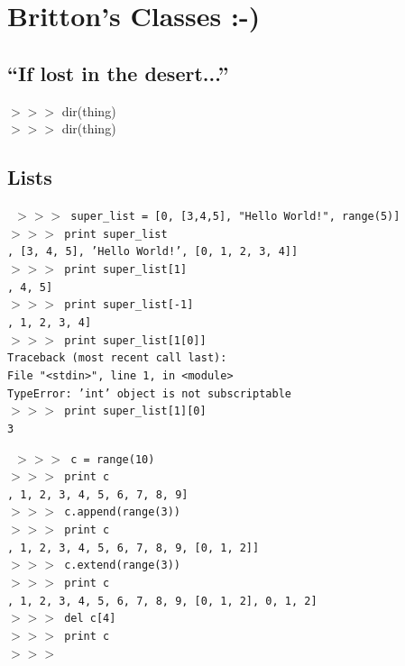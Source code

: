\documentclass[11pt,a4paper]{article}
\begin{document}
\section{Britton's Classes :-)}

\subsection{``If lost in the desert...''}
$>>>$ dir(thing) \\
$>>>$ dir(thing) \\


\subsection{Lists}
{\tt 
$>>>$ super\_list = [0, [3,4,5], "Hello World!", range(5)] \\
$>>>$ print super\_list \\
, [3, 4, 5], 'Hello World!', [0, 1, 2, 3, 4]] \\
$>>>$ print super\_list[1] \\
, 4, 5] \\
$>>>$ print super\_list[-1]\\
, 1, 2, 3, 4] \\
$>>>$ print super\_list[1[0]] \\
Traceback (most recent call last):\\
  File "<stdin>", line 1, in <module>\\
TypeError: 'int' object is not subscriptable\\
$>>>$ print super\_list[1][0] \\
  3\\
}

{\tt 
$>>>$ c = range(10) \\
$>>>$ print c \\
, 1, 2, 3, 4, 5, 6, 7, 8, 9]\\
$>>>$ c.append(range(3)) \\
$>>>$ print c \\
, 1, 2, 3, 4, 5, 6, 7, 8, 9, [0, 1, 2]]\\
$>>>$ c.extend(range(3)) \\
$>>>$ print c \\
, 1, 2, 3, 4, 5, 6, 7, 8, 9, [0, 1, 2], 0, 1, 2]\\
$>>>$ del c[4]\\
$>>>$ print c\\
$>>>$ 
}
\end{document}
